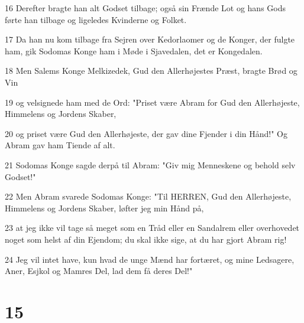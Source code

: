 \par 16 Derefter bragte han alt Godset tilbage; også sin Frænde Lot og hans Gods førte han tilbage og ligeledes Kvinderne og Folket.
\par 17 Da han nu kom tilbage fra Sejren over Kedorlaomer og de Konger, der fulgte ham, gik Sodomas Konge ham i Møde i Sjavedalen, det er Kongedalen.
\par 18 Men Salems Konge Melkizedek, Gud den Allerhøjestes Præst, bragte Brød og Vin
\par 19 og velsignede ham med de Ord: "Priset være Abram for Gud den Allerhøjeste, Himmelens og Jordens Skaber,
\par 20 og priset være Gud den Allerhøjeste, der gav dine Fjender i din Hånd!" Og Abram gav ham Tiende af alt.
\par 21 Sodomas Konge sagde derpå til Abram: "Giv mig Menneskene og behold selv Godset!"
\par 22 Men Abram svarede Sodomas Konge: "Til HERREN, Gud den Allerhøjeste, Himmelens og Jordens Skaber, løfter jeg min Hånd på,
\par 23 at jeg ikke vil tage så meget som en Tråd eller en Sandalrem eller overhovedet noget som helst af din Ejendom; du skal ikke sige, at du har gjort Abram rig!
\par 24 Jeg vil intet have, kun hvad de unge Mænd har fortæret, og mine Ledsagere, Aner, Esjkol og Mamres Del, lad dem få deres Del!"

\chapter{15}

